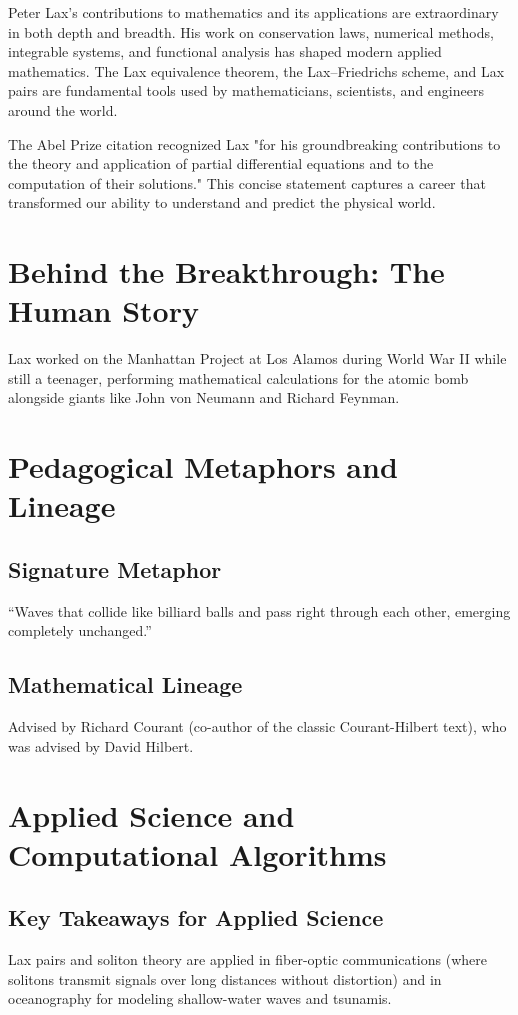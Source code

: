 Peter Lax's contributions to mathematics and its applications are extraordinary in both depth and breadth. His work on conservation laws, numerical methods, integrable systems, and functional analysis has shaped modern applied mathematics. The Lax equivalence theorem, the Lax--Friedrichs scheme, and Lax pairs are fundamental tools used by mathematicians, scientists, and engineers around the world.

The Abel Prize citation recognized Lax "for his groundbreaking contributions to the theory and application of partial differential equations and to the computation of their solutions." This concise statement captures a career that transformed our ability to understand and predict the physical world.


\section{Behind the Breakthrough: The Human Story}
Lax worked on the Manhattan Project at Los Alamos during World War II while still a teenager, performing mathematical calculations for the atomic bomb alongside giants like John von Neumann and Richard Feynman.

\section{Pedagogical Metaphors and Lineage}
\subsection{Signature Metaphor}
``Waves that collide like billiard balls and pass right through each other, emerging completely unchanged.''

\subsection{Mathematical Lineage}
Advised by Richard Courant (co-author of the classic Courant-Hilbert text), who was advised by David Hilbert.

\section{Applied Science and Computational Algorithms}
\subsection{Key Takeaways for Applied Science}
Lax pairs and soliton theory are applied in fiber-optic communications (where solitons transmit signals over long distances without distortion) and in oceanography for modeling shallow-water waves and tsunamis.


